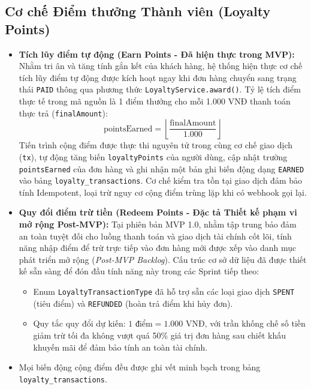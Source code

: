 \documentclass[12pt,a4paper,oneside]{report}
\begin{document}
\subsection{Cơ chế Điểm thưởng Thành viên (Loyalty Points)}
\begin{itemize}
    \item \textbf{Tích lũy điểm tự động (Earn Points - Đã hiện thực trong MVP):}
    Nhằm tri ân và tăng tính gắn kết của khách hàng, hệ thống hiện thực cơ chế tích lũy điểm tự động được kích hoạt ngay khi đơn hàng chuyển sang trạng thái \texttt{PAID} thông qua phương thức \texttt{LoyaltyService.award()}. Tỷ lệ tích điểm thực tế trong mã nguồn là 1 điểm thưởng cho mỗi 1.000 VNĐ thanh toán thực trả (\texttt{finalAmount}):
    \[
    \text{pointsEarned} = \left\lfloor \frac{\text{finalAmount}}{1.000} \right\rfloor
    \]
    Tiến trình cộng điểm được thực thi nguyên tử trong cùng cơ chế giao dịch (\texttt{tx}), tự động tăng biến \texttt{loyaltyPoints} của người dùng, cập nhật trường \texttt{pointsEarned} của đơn hàng và ghi nhận một bản ghi biến động dạng \texttt{EARNED} vào bảng \texttt{loyalty\_transactions}. Cơ chế kiểm tra tồn tại giao dịch đảm bảo tính Idempotent, loại trừ nguy cơ cộng điểm trùng lặp khi có webhook gọi lại.

    \item \textbf{Quy đổi điểm trừ tiền (Redeem Points - Đặc tả Thiết kế phạm vi mở rộng Post-MVP):}
    Tại phiên bản MVP 1.0, nhằm tập trung bảo đảm an toàn tuyệt đối cho luồng thanh toán và giao dịch tài chính cốt lõi, tính năng nhập điểm để trừ trực tiếp vào đơn hàng mới được xếp vào danh mục phát triển mở rộng (\textit{Post-MVP Backlog}). Cấu trúc cơ sở dữ liệu đã được thiết kế sẵn sàng để đón đầu tính năng này trong các Sprint tiếp theo:
    \begin{itemize}
        \item Enum \texttt{LoyaltyTransactionType} đã hỗ trợ sẵn các loại giao dịch \texttt{SPENT} (tiêu điểm) và \texttt{REFUNDED} (hoàn trả điểm khi hủy đơn).
        \item Quy tắc quy đổi dự kiến: \(1 \text{ điểm} = 1.000 \text{ VNĐ}\), với trần khống chế số tiền giảm trừ tối đa không vượt quá 50\% giá trị đơn hàng sau chiết khấu khuyến mãi để đảm bảo tính an toàn tài chính.
    \end{itemize}
    \item Mọi biến động cộng điểm đều được ghi vết minh bạch trong bảng \texttt{loyalty\_transactions}.
\end{itemize}
\end{document}
